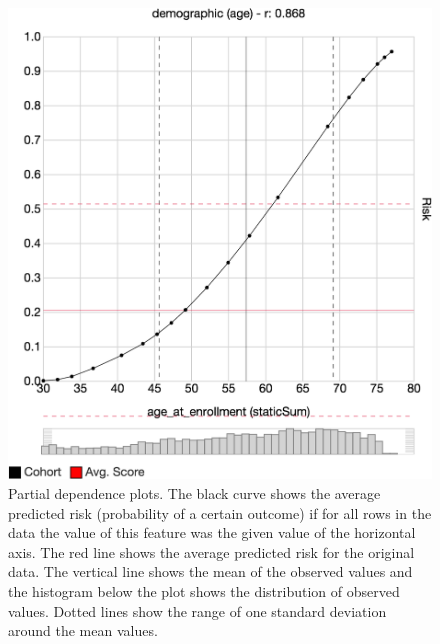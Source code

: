 \begin{figure}[t]
\centering
\includegraphics[width=0.55\linewidth]{prospector/pdp_reg} %
\caption[Partial dependence plots.]{
Partial dependence plots. The black curve shows the average predicted risk
(probability of a certain outcome) if for all rows in the data the value of this
feature was the given value of the horizontal axis.
The red line shows the average predicted risk for the original data.
The vertical line shows the mean of the observed values and the histogram below the plot
shows the distribution of observed values.
Dotted lines show the range of one standard deviation around the mean values.
}
\label{figs:pdp}
\end{figure}